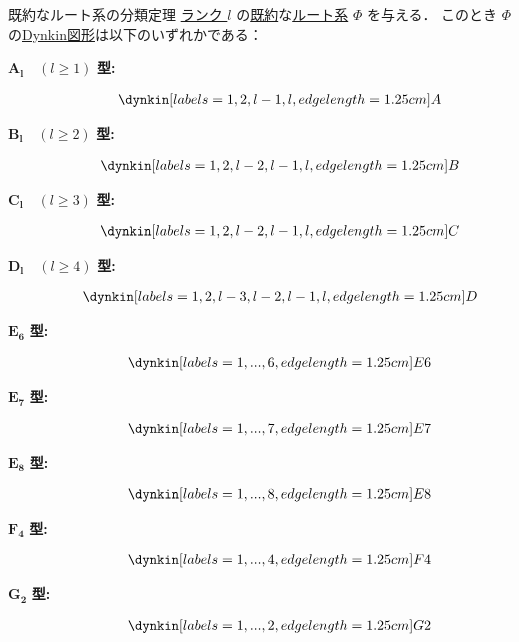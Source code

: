 \documentclass[rep_main]{subfiles}
\begin{document}
\begin{mytheo}[label=thm:root-classification,breakable]{既約なルート系の分類定理}
	\hyperref[def:rank-root]{ランク $l$} の\hyperref[def:irr-root]{既約}な\hyperref[ax:root-system]{ルート系} $\Phi$ を与える．
	このとき $\Phi$ の\hyperref[def:Coxeter-Dynkin]{Dynkin図形}は以下のいずれかである：
	\begin{description}
		\item[$\bm{A_l}\quad (l \ge 1)$ \textbf{型:}] 
		\begin{align}
			\dynkin[%
					labels={1,2,l-1,l},
					edge length=1.25cm
				] A{}
		\end{align}
		
		\item[$\bm{B_l}\quad (l \ge 2)$ \textbf{型:}] 
		\begin{align}
			\dynkin[%
					labels={1,2,l-2,l-1,l},
					edge length=1.25cm
				] B{}
		\end{align}

		\item[$\bm{C_l}\quad (l \ge 3)$ \textbf{型:}] 
		\begin{align}
			\dynkin[%
					labels={1,2,l-2,l-1,l},
					edge length=1.25cm
				] C{}
		\end{align}

		\item[$\bm{D_l}\quad (l \ge 4)$ \textbf{型:}] 
		\begin{align}
			\dynkin[%
					labels={1,2,l-3,l-2,l-1,l},
					edge length=1.25cm
				] D{}
		\end{align}

		\item[$\bm{E_6}$ \textbf{型:}] 
		\begin{align}
			\dynkin[%
					labels={1,...,6},
					edge length=1.25cm
				] E6
		\end{align}

		\item[$\bm{E_7}$ \textbf{型:}] 
		\begin{align}
			\dynkin[%
					labels={1,...,7},
					edge length=1.25cm
				] E7
		\end{align}

		\item[$\bm{E_8}$ \textbf{型:}] 
		\begin{align}
			\dynkin[%
					labels={1,...,8},
					edge length=1.25cm
				] E8
		\end{align}
		\item[$\bm{F_4}$ \textbf{型:}] 
		\begin{align}
			\dynkin[%
					labels={1,...,4},
					edge length=1.25cm
				] F4
		\end{align}
		\item[$\bm{G_2}$ \textbf{型:}] 
		\begin{align}
			\dynkin[%
					labels={1,...,2},
					edge length=1.25cm
				] G2
		\end{align}
	\end{description}
\end{mytheo}
\end{document}
